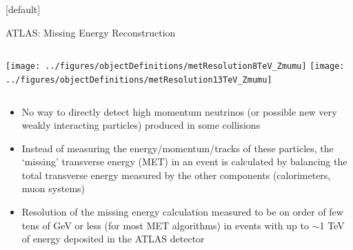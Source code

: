 \documentclass{beamer}
\begin{document}
{  \makeatletter %
  [default]
  \def\beamer@entrycode{\vspace*{-1.075\headheight}}
  \begin{frame}{ATLAS: Missing Energy Reconstruction}
    \vspace{10pt}
    \begin{columns}
      \texttt{[image: ../figures/objectDefinitions/metResolution8TeV\_Zmumu]}
      \texttt{[image: ../figures/objectDefinitions/metResolution13TeV\_Zmumu]}
    \end{columns}
    \begin{itemize}\small
    \item No way to directly detect high momentum neutrinos (or possible new very weakly interacting particles) produced in some collisions
    \item Instead of measuring the energy/momentum/tracks of these particles, the `missing' transverse energy (MET) in an event is calculated by balancing the total transverse energy measured by the other components (calorimeters, muon systems) 
    \item Resolution of the missing energy calculation measured to be on order of few tens of GeV or less (for most MET algorithms) in events with up to $\sim$1 TeV of energy deposited in the ATLAS detector
    \end{itemize}

  \end{frame}

}
\end{document}
